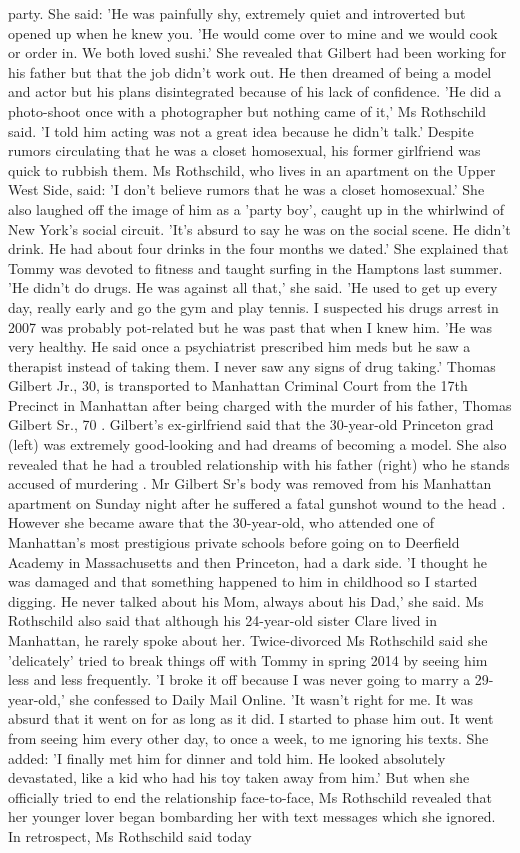 \begin{table}[H]
party. She said: 'He was painfully shy, extremely quiet and introverted but opened up when he knew you. 'He would come over to mine and we would cook or order in. We both loved sushi.' She revealed that Gilbert had been working for his father but that the job didn't work out. He then dreamed of being a model and actor but his plans disintegrated because of his lack of confidence. 'He did a photo-shoot once with a photographer but nothing came of it,' Ms Rothschild said. 'I told him acting was not a great idea because he didn’t talk.' Despite rumors circulating that he was a closet homosexual, his former girlfriend was quick to rubbish them. Ms Rothschild, who lives in an apartment on the Upper West Side, said: 'I don’t believe rumors that he was a closet homosexual.' She also laughed off the image of him as a 'party boy', caught up in the whirlwind of New York's social circuit. 'It’s absurd to say he was on the social scene. He didn’t drink. He had about four drinks in the four months we dated.' She explained that Tommy was devoted to fitness and taught surfing in the Hamptons last summer. 'He didn’t do drugs. He was against all that,' she said. 'He used to get up every day, really early and go the gym and play tennis. I suspected his drugs arrest in 2007 was probably pot-related but he was past that when I knew him. 'He was very healthy. He said once a psychiatrist prescribed him meds but he saw a therapist instead of taking them. I never saw any signs of drug taking.' Thomas Gilbert Jr., 30, is transported to Manhattan Criminal Court from the 17th Precinct in Manhattan after being charged with the murder of his father, Thomas Gilbert Sr., 70 . Gilbert's ex-girlfriend said that the 30-year-old Princeton grad (left) was extremely good-looking and had dreams of becoming a model. She also revealed that he had a troubled relationship with his father (right) who he stands accused of murdering . Mr Gilbert Sr's body was removed from his Manhattan apartment on Sunday night after he suffered a fatal gunshot wound to the head . However she became aware that the 30-year-old, who attended one of Manhattan's most prestigious private schools before going on to Deerfield Academy in Massachusetts and then Princeton, had a dark side. 'I thought he was damaged and that something happened to him in childhood so I started digging. He never talked about his Mom, always about his Dad,' she said. Ms Rothschild also said that although his 24-year-old sister Clare lived in Manhattan, he rarely spoke about her. Twice-divorced Ms Rothschild said she 'delicately' tried to break things off with Tommy in spring 2014 by seeing him less and less frequently. 'I broke it off because I was never going to marry a 29-year-old,' she confessed to Daily Mail Online. 'It wasn’t right for me. It was absurd that it went on for as long as it did. I started to phase him out. It went from seeing him every other day, to once a week, to me ignoring his texts. She added: 'I finally met him for dinner and told him. He looked absolutely devastated, like a kid who had his toy taken away from him.' But when she officially tried to end the relationship face-to-face, Ms Rothschild revealed that her younger lover began bombarding her with text messages which she ignored. In retrospect, Ms Rothschild said today 
\end{table}
